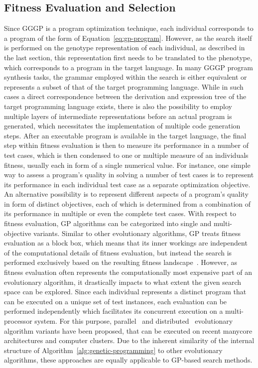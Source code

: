 \subsection{Fitness Evaluation and Selection}
Since GGGP is a program optimization technique, each individual corresponds to a program of the form of Equation~\eqref{eq:gp-program}.
However, as the search itself is performed on the genotype representation of each individual, as described in the last section, this representation first needs to be translated to the phenotype, which corresponds to a program in the target language.
In many GGGP program synthesis tasks, the grammar employed within the search is either equivalent or represents a subset of that of the target programming language.
While in such cases a direct correspondence between the derivation and expression tree of the target programming language exists, there is also the possibility to employ multiple layers of intermediate representations before an actual program is generated, which necessitates the implementation of multiple code generation steps.
After an executable program is available in the target language, the final step within fitness evaluation is then to measure its performance in a number of test cases, which is then condensed to one or multiple measure of an individuals fitness, usually each in form of a single numerical value.
For instance, one simple way to assess a program's quality in solving a number of test cases is to represent its performance in each individual test case as a separate optimization objective.
An alternative possibility is to represent different aspects of a program's quality in form of distinct objectives, each of which is determined from a combination of its performance in multiple or even the complete test cases.
With respect to fitness evaluation, GP algorithms can be categorized into single and multi-objective variants.
Similar to other evolutionary algorithms, GP treats fitness evaluation as a block box, which means that its inner workings are independent of the computational details of fitness evaluation, but instead the search is performed exclusively based on the resulting fitness landscape~\cite{pitzer2012comprehensive}.
However, as fitness evaluation often represents the computationally most expensive part of an evolutionary algorithm, it drastically impacts to what extent the given search space can be explored.
Since each individual represents a distinct program that can be executed on a unique set of test instances, each evaluation can be performed independently which facilitates its concurrent execution on a multi-processor system.
For this purpose, parallel~\cite{sudholt2015parallel} and distributed~\cite{gong2015distributed} evolutionary algorithm variants have been proposed, that can be executed on recent manycore architectures and computer clusters.
Due to the inherent similarity of the internal structure of Algorithm~\ref{alg:genetic-programming} to other evolutionary algorithms, these approaches are equally applicable to GP-based search methods. 

